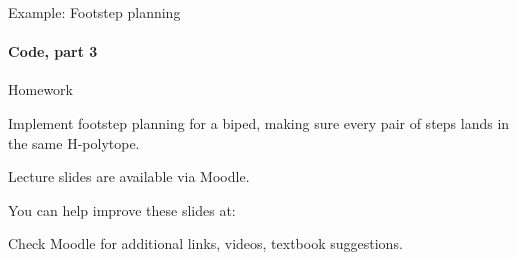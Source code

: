 \documentclass{beamer}
\begin{document}
\begin{frame}{Example: Footstep planning}
\framesubtitle{Code, part 3}
\begin{flushleft}


 
\end{flushleft}
\end{frame}




\begin{frame}{Homework}
\begin{flushleft}

Implement footstep planning for a biped, making sure every pair of steps lands in the same H-polytope.

\end{flushleft}
\end{frame}



\begin{frame}
	\centerline{Lecture slides are available via Moodle.}
	\bigskip
	\centerline{You can help improve these slides at:}
	\centerline{
		\mygit
	}
	\bigskip
	
	\textcolor{black}{}
	\bigskip
	
	
	\centerline{Check Moodle for additional links, videos, textbook suggestions.}
\end{frame}
\end{document}
